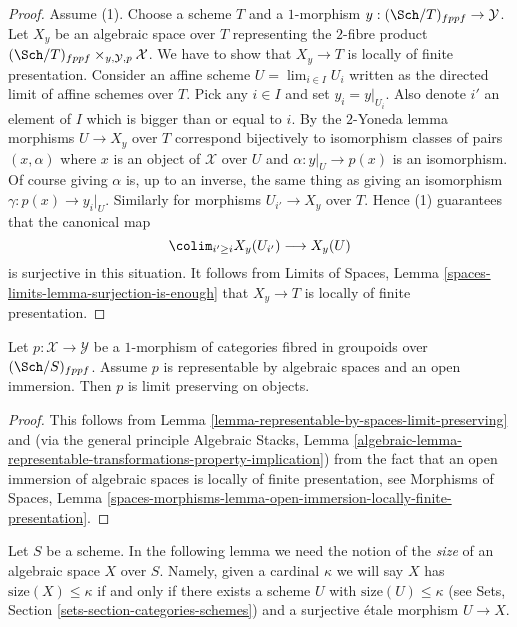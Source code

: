 \begin{proof}
\medskip\noindent
Assume (1). Choose a scheme $T$ and a $1$-morphism
$y : (\Sch/T)_{fppf} \to \mathcal{Y}$. Let
$X_y$ be an algebraic space over $T$ representing the $2$-fibre product
$(\Sch/T)_{fppf} \times_{y, \mathcal{Y}, p} \mathcal{X}$.
We have to show that $X_y \to T$ is locally of finite presentation.
Consider an affine scheme $U = \lim_{i \in I} U_i$ written as the
directed limit of affine schemes over $T$.
Pick any $i \in I$ and set $y_i = y|_{U_i}$. Also denote $i'$ an element
of $I$ which is bigger than or equal to $i$. By the $2$-Yoneda lemma
morphisms $U \to X_y$ over $T$ correspond bijectively
to isomorphism classes of pairs $(x, \alpha)$ where $x$ is an object
of $\mathcal{X}$ over $U$ and $\alpha : y|_U \to p(x)$ is an isomorphism.
Of course giving $\alpha$ is, up to an inverse, the same thing as giving
an isomorphism $\gamma : p(x) \to y_i|_U$.
Similarly for morphisms $U_{i'} \to X_y$ over $T$. Hence (1) guarantees
that the canonical map
$$
\colim_{i' \geq i} X_y(U_{i'}) \longrightarrow X_y(U)
$$
is surjective in this situation. It follows from
Limits of Spaces, Lemma \ref{spaces-limits-lemma-surjection-is-enough}
that $X_y \to T$ is locally of finite presentation.
\end{proof}

\begin{lemma}
\label{lemma-open-immersion-limit-preserving}
Let $p : \mathcal{X} \to \mathcal{Y}$ be a $1$-morphism of categories
fibred in groupoids over $(\Sch/S)_{fppf}$. Assume $p$ is representable
by algebraic spaces and an open immersion. Then $p$ is limit preserving
on objects.
\end{lemma}

\begin{proof}
This follows from
Lemma \ref{lemma-representable-by-spaces-limit-preserving}
and (via the general principle
Algebraic Stacks, Lemma
\ref{algebraic-lemma-representable-transformations-property-implication})
from the fact that an open immersion of algebraic spaces is
locally of finite presentation, see
Morphisms of Spaces, Lemma
\ref{spaces-morphisms-lemma-open-immersion-locally-finite-presentation}.
\end{proof}

\noindent
Let $S$ be a scheme. In the following lemma we need the notion of the
{\it size} of an algebraic space $X$ over $S$. Namely, given a cardinal
$\kappa$ we will say $X$ has $\text{size}(X) \leq \kappa$ if and only
if there exists a scheme $U$ with $\text{size}(U) \leq \kappa$ (see
Sets, Section \ref{sets-section-categories-schemes}) and a surjective
\'etale morphism $U \to X$.

